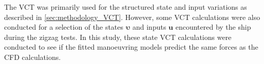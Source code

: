 \noindent The VCT was primarily used for the structured state and input variations as described in \autoref{sec:methodology_VCT}. However, some VCT calculations were also conducted for a selection of the states $\pmb{\bm{\upsilon}}$ and inputs $\mathbf{u}$ encountered by the ship during the zigzag tests. In this study, these state VCT calculations were conducted to see if the fitted manoeuvring models predict the same forces as the CFD calculations.